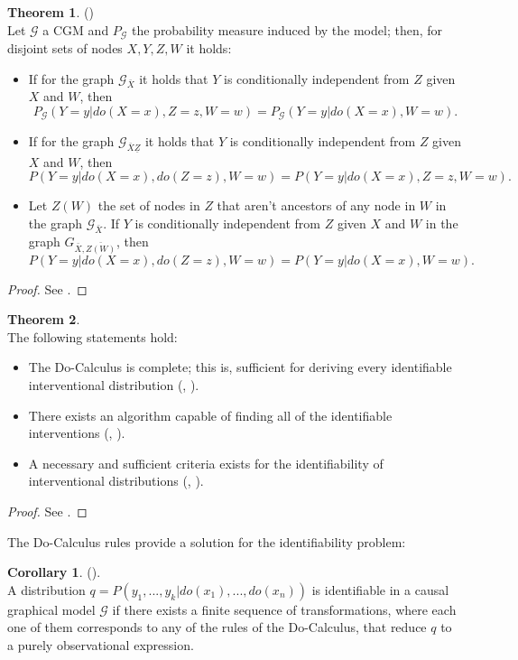 \documentclass[english,letterpaper,12pt,final]{article}
\theoremstyle{definition}
\newtheorem{teo}{Theorem}[section]
\newtheorem{cor}{Corollary}[section]
\begin{document}
	\begin{teo}{\label{docalculus}} (\cite{pearl2009causality})\\
Let $\mathcal{G}$ a CGM and $P_{\mathcal{G}}$ the probability measure induced by the model; then, for disjoint sets of nodes $X,Y,Z,W$ it holds:
\begin{itemize}
\item If for the graph $\mathcal{G}_{\bar{X}}$ it holds that $Y$ is conditionally independent from  $Z$ given $X$ and $W$, then
\[ P_{\mathcal{G}}(Y=y | do(X=x), Z=z, W=w) = P_{\mathcal{G}}(Y=y | do(X=x), W=w). \]
\item If for the graph $\mathcal{G}_{\bar{X}\underline{Z}}$ it holds that $Y$ is conditionally independent from $Z$ given $X$ and $W$, then
\[ P(Y=y | do(X=x), do(Z=z), W=w) = P(Y=y | do(X=x), Z = z, W=w). \]
\item Let $Z(W)$ the set of nodes in  $Z$ that aren't ancestors of any node in  $W$ in the graph $\mathcal{G}_{\bar{X}}$.  If $Y$ is conditionally independent from $Z$ given $X$ and $W$ in the graph $G_{\bar{X}, \bar{Z(W)}}$, then
\[ P(Y=y | do(X=x), do(Z=z), W=w) = P(Y=y | do(X=x), W=w). \]
\end{itemize}
\end{teo}
\begin{proof}
See \cite{pearl2009causality}.
\end{proof}
\begin{teo}{\cite{peters2017elements}}\\
The following statements hold:
\begin{itemize}
\item The Do-Calculus is complete; this is, sufficient for deriving every identifiable interventional distribution (\cite{huang2006pearl}, \cite{shpitser2006identification}).
\item There exists an algorithm capable of finding all of the identifiable interventions (\cite{tian2002}, \cite{huang2006pearl}).
\item A necessary and sufficient criteria exists for the identifiability of interventional distributions (\cite{shpitser2006identification}, \cite{huang2006pearl}).
\end{itemize}
\end{teo}
\begin{proof}
See \cite{peters2017elements}.
\end{proof}
The Do-Calculus rules provide a solution for the identifiability problem:
\begin{cor} (\cite{pearl2009causality}).\\
A distribution $q=P(y_1,...,y_k | do(x_1),...,do(x_n))$ is identifiable in a causal graphical model $\mathcal{G}$ if there exists a finite sequence of transformations, where each one of them corresponds to any of the rules of the Do-Calculus, that reduce $q$ to a purely observational expression.
\end{cor}
\end{document}
